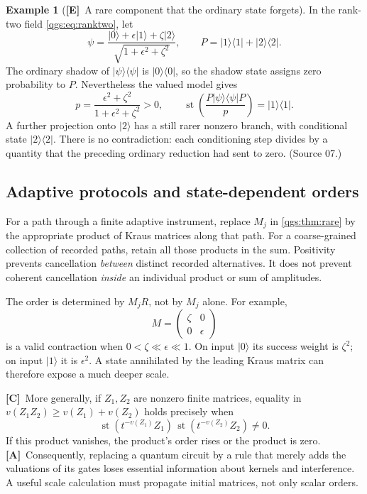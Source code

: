 \documentclass[11pt,oneside]{article}
\numberwithin{equation}{section}
\theoremstyle{plain}
\theoremstyle{definition}
\newtheorem{example}[example]{Example}
\theoremstyle{remark}
\DeclareMathOperator{\st}{st}
\newcommand{\ket}[1]{\lvert#1\rangle}
\newcommand{\bra}[1]{\langle#1\rvert}
\newcommand{\proj}[1]{\ket{#1}\!\bra{#1}}
\newcommand{\TE}{\textcolor{TierE}{\textsf{\bfseries[E]}}}
\newcommand{\TC}{\textcolor{TierC}{\textsf{\bfseries[C]}}}
\newcommand{\TA}{\textcolor{TierA}{\textsf{\bfseries[A]}}}
\begin{document}
\begin{example}[\TE\ A rare component that the ordinary state forgets]\label{qgs:ex:rare3}
In the rank-two field \eqref{qgs:eq:ranktwo}, let
\[
 \psi=\frac{\ket{0}+\epsilon\ket{1}+\zeta\ket{2}}
 {\sqrt{1+\epsilon^2+\zeta^2}},\qquad
 P=\proj{1}+\proj{2}.
\]
The ordinary shadow of $\proj{\psi}$ is $\proj{0}$, so the shadow state assigns zero probability to $P$. Nevertheless the valued model gives
\[
 p=\frac{\epsilon^2+\zeta^2}{1+\epsilon^2+\zeta^2}>0,
 \qquad
 \st\!\left(\frac{P\proj{\psi}P}{p}\right)=\proj{1}.
\]
A further projection onto $\ket{2}$ has a still rarer nonzero branch, with conditional state $\proj{2}$. There is no contradiction: each conditioning step divides by a quantity that the preceding ordinary reduction had sent to zero. (Source 07.)
\end{example}

\subsection{Adaptive protocols and state-dependent orders}
For a path through a finite adaptive instrument, replace $M_j$ in \cref{qgs:thm:rare} by the appropriate product of Kraus matrices along that path. For a coarse-grained collection of recorded paths, retain all those products in the sum. Positivity prevents cancellation \emph{between} distinct recorded alternatives. It does not prevent coherent cancellation \emph{inside} an individual product or sum of amplitudes.

The order is determined by $M_jR$, not by $M_j$ alone. For example,
\[
 M=\begin{pmatrix}\zeta&0\\0&\epsilon\end{pmatrix}
\]
is a valid contraction when $0<\zeta\ll\epsilon\ll1$. On input $\ket{0}$ its success weight is $\zeta^2$; on input $\ket{1}$ it is $\epsilon^2$. A state annihilated by the leading Kraus matrix can therefore expose a much deeper scale.

\TC\ More generally, if $Z_1,Z_2$ are nonzero finite matrices, equality in $v(Z_1Z_2)\ge v(Z_1)+v(Z_2)$ holds precisely when
\[
 \st(t^{-v(Z_1)}Z_1)\,\st(t^{-v(Z_2)}Z_2)\ne0.
\]
If this product vanishes, the product's order rises or the product is zero. \TA\ Consequently, replacing a quantum circuit by a rule that merely adds the valuations of its gates loses essential information about kernels and interference. A useful scale calculation must propagate initial matrices, not only scalar orders.
\end{document}

